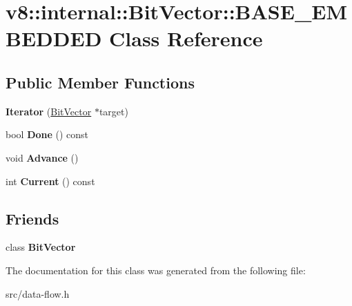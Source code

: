 \hypertarget{classv8_1_1internal_1_1_bit_vector_1_1_b_a_s_e___e_m_b_e_d_d_e_d}{}\section{v8\+:\+:internal\+:\+:Bit\+Vector\+:\+:B\+A\+S\+E\+\_\+\+E\+M\+B\+E\+D\+D\+E\+D Class Reference}
\label{classv8_1_1internal_1_1_bit_vector_1_1_b_a_s_e___e_m_b_e_d_d_e_d}
\subsection*{Public Member Functions}
\begin{DoxyCompactItemize}
\item 
\hypertarget{classv8_1_1internal_1_1_bit_vector_1_1_b_a_s_e___e_m_b_e_d_d_e_d_adaf9ef5c42e0c648c060f8ab3e4235c3}{}{\bfseries Iterator} (\hyperlink{classv8_1_1internal_1_1_bit_vector}{Bit\+Vector} $\ast$target)\label{classv8_1_1internal_1_1_bit_vector_1_1_b_a_s_e___e_m_b_e_d_d_e_d_adaf9ef5c42e0c648c060f8ab3e4235c3}

\item 
\hypertarget{classv8_1_1internal_1_1_bit_vector_1_1_b_a_s_e___e_m_b_e_d_d_e_d_ae6988869cfebb29b17c07bfcb65c1694}{}bool {\bfseries Done} () const \label{classv8_1_1internal_1_1_bit_vector_1_1_b_a_s_e___e_m_b_e_d_d_e_d_ae6988869cfebb29b17c07bfcb65c1694}

\item 
\hypertarget{classv8_1_1internal_1_1_bit_vector_1_1_b_a_s_e___e_m_b_e_d_d_e_d_a03c56bde179c06cec962c2cb05eaa08b}{}void {\bfseries Advance} ()\label{classv8_1_1internal_1_1_bit_vector_1_1_b_a_s_e___e_m_b_e_d_d_e_d_a03c56bde179c06cec962c2cb05eaa08b}

\item 
\hypertarget{classv8_1_1internal_1_1_bit_vector_1_1_b_a_s_e___e_m_b_e_d_d_e_d_a8297bcf5e98da19cb8b3de091f85838b}{}int {\bfseries Current} () const \label{classv8_1_1internal_1_1_bit_vector_1_1_b_a_s_e___e_m_b_e_d_d_e_d_a8297bcf5e98da19cb8b3de091f85838b}

\end{DoxyCompactItemize}
\subsection*{Friends}
\begin{DoxyCompactItemize}
\item 
\hypertarget{classv8_1_1internal_1_1_bit_vector_1_1_b_a_s_e___e_m_b_e_d_d_e_d_a36e8ce805d9208092c1351bd2d513e2d}{}class {\bfseries Bit\+Vector}\label{classv8_1_1internal_1_1_bit_vector_1_1_b_a_s_e___e_m_b_e_d_d_e_d_a36e8ce805d9208092c1351bd2d513e2d}

\end{DoxyCompactItemize}


The documentation for this class was generated from the following file\+:\begin{DoxyCompactItemize}
\item 
src/data-\/flow.\+h\end{DoxyCompactItemize}
